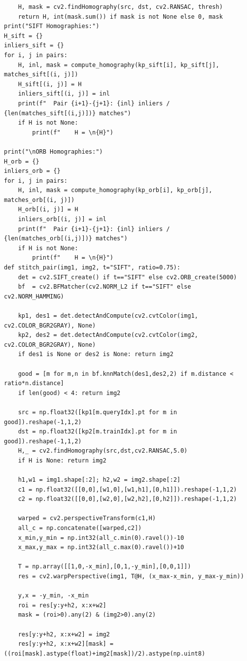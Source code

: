 \documentclass[a4paper,12pt]{article}
\begin{document}
\begin{lstlisting}
    H, mask = cv2.findHomography(src, dst, cv2.RANSAC, thresh)
    return H, int(mask.sum()) if mask is not None else 0, mask
print("SIFT Homographies:")
H_sift = {}
inliers_sift = {}
for i, j in pairs:
    H, inl, mask = compute_homography(kp_sift[i], kp_sift[j], matches_sift[(i, j)])
    H_sift[(i, j)] = H
    inliers_sift[(i, j)] = inl
    print(f"  Pair {i+1}-{j+1}: {inl} inliers / {len(matches_sift[(i,j)])} matches")
    if H is not None:
        print(f"    H = \n{H}")

print("\nORB Homographies:")
H_orb = {}
inliers_orb = {}
for i, j in pairs:
    H, inl, mask = compute_homography(kp_orb[i], kp_orb[j], matches_orb[(i, j)])
    H_orb[(i, j)] = H
    inliers_orb[(i, j)] = inl
    print(f"  Pair {i+1}-{j+1}: {inl} inliers / {len(matches_orb[(i,j)])} matches")
    if H is not None:
        print(f"    H = \n{H}")
def stitch_pair(img1, img2, t="SIFT", ratio=0.75):
    det = cv2.SIFT_create() if t=="SIFT" else cv2.ORB_create(5000)
    bf  = cv2.BFMatcher(cv2.NORM_L2 if t=="SIFT" else cv2.NORM_HAMMING)

    kp1, des1 = det.detectAndCompute(cv2.cvtColor(img1, cv2.COLOR_BGR2GRAY), None)
    kp2, des2 = det.detectAndCompute(cv2.cvtColor(img2, cv2.COLOR_BGR2GRAY), None)
    if des1 is None or des2 is None: return img2

    good = [m for m,n in bf.knnMatch(des1,des2,2) if m.distance < ratio*n.distance]
    if len(good) < 4: return img2

    src = np.float32([kp1[m.queryIdx].pt for m in good]).reshape(-1,1,2)
    dst = np.float32([kp2[m.trainIdx].pt for m in good]).reshape(-1,1,2)
    H,_ = cv2.findHomography(src,dst,cv2.RANSAC,5.0)
    if H is None: return img2

    h1,w1 = img1.shape[:2]; h2,w2 = img2.shape[:2]
    c1 = np.float32([[0,0],[w1,0],[w1,h1],[0,h1]]).reshape(-1,1,2)
    c2 = np.float32([[0,0],[w2,0],[w2,h2],[0,h2]]).reshape(-1,1,2)

    warped = cv2.perspectiveTransform(c1,H)
    all_c = np.concatenate([warped,c2])
    x_min,y_min = np.int32(all_c.min(0).ravel())-10
    x_max,y_max = np.int32(all_c.max(0).ravel())+10

    T = np.array([[1,0,-x_min],[0,1,-y_min],[0,0,1]])
    res = cv2.warpPerspective(img1, T@H, (x_max-x_min, y_max-y_min))

    y,x = -y_min, -x_min
    roi = res[y:y+h2, x:x+w2]
    mask = (roi>0).any(2) & (img2>0).any(2)

    res[y:y+h2, x:x+w2] = img2
    res[y:y+h2, x:x+w2][mask] = ((roi[mask].astype(float)+img2[mask])/2).astype(np.uint8)


\end{lstlisting}
\end{document}
